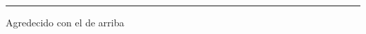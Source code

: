 \begin{acknowledgements}
\hrule \bigskip \vspace*{1cm}
Agredecido con el de arriba

\end{acknowledgements}
